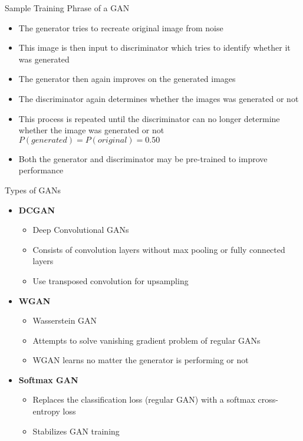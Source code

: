 \documentclass{beamer}
\begin{document}
	\begin{frame}{Sample Training Phrase of a GAN}
		\begin{itemize}
			\item The generator tries to recreate original image from noise
			\item This image is then input to discriminator which tries to identify whether it was generated
			\item The generator then again improves on the generated images
			\item The discriminator again determines whether the images was generated or not
			\item This process is repeated until the discriminator can no longer determine whether the image was generated or not $P(generated) = P(original) = 0.50$
			\item Both the generator and discriminator may be pre-trained to improve performance
		\end{itemize}
	\end{frame}

	\begin{frame}{Types of GANs}
		\begin{itemize}
			\item \textbf{DCGAN}
			\begin{itemize}
				\item Deep Convolutional GANs
				\item Consists of convolution layers without max pooling or fully connected layers
				\item Use transposed convolution for upsampling
			\end{itemize}
			\item \textbf{WGAN}
			\begin{itemize}
				\item Wasserstein GAN
				\item Attempts to solve vanishing gradient problem of regular GANs
				\item WGAN learns no matter the generator is performing or not
			\end{itemize}
		\item \textbf{Softmax GAN}
		\begin{itemize}
			\item  Replaces the classification loss (regular GAN) with a softmax cross-entropy loss 
			\item  Stabilizes GAN training
		\end{itemize}
		\end{itemize}
	\end{frame}
\end{document}
